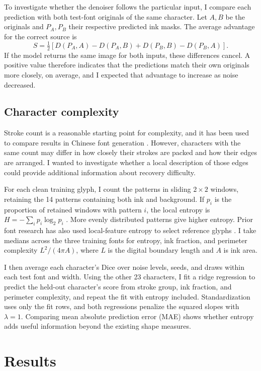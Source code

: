 \documentclass[11pt,letterpaper]{article}
\begin{document}
To investigate whether the denoiser follows the particular input, I compare each prediction with both test-font originals of the same character. Let \(A,B\) be the originals and \(P_A,P_B\) their respective predicted ink masks. The average advantage for the correct source is
\[
S=\tfrac12\left[D(P_A,A)-D(P_A,B)+D(P_B,B)-D(P_B,A)\right].
\]
If the model returns the same image for both inputs, these differences cancel. A positive value therefore indicates that the predictions match their own originals more closely, on average, and I expected that advantage to increase as noise decreased.

\subsection{Character complexity}

Stroke count is a reasonable starting point for complexity, and it has been used to compare results in Chinese font generation \cite{yang2024fontdiffuser}. However, characters with the same count may differ in how closely their strokes are packed and how their edges are arranged. I wanted to investigate whether a local description of those edges could provide additional information about recovery difficulty.

For each clean training glyph, I count the patterns in sliding \(2\times2\) windows, retaining the 14 patterns containing both ink and background. If \(p_i\) is the proportion of retained windows with pattern \(i\), the local entropy is \(H=-\sum_i p_i\log_2p_i\) \cite{shannon1948}. More evenly distributed patterns give higher entropy. Prior font research has also used local-feature entropy to select reference glyphs \cite{matsuo2026active}. I take medians across the three training fonts for entropy, ink fraction, and perimeter complexity \(L^2/(4\pi A)\), where \(L\) is the digital boundary length and \(A\) is ink area.

I then average each character's Dice over noise levels, seeds, and draws within each test font and width. Using the other 23 characters, I fit a ridge regression to predict the held-out character's score from stroke group, ink fraction, and perimeter complexity, and repeat the fit with entropy included. Standardization uses only the fit rows, and both regressions penalize the squared slopes with \(\lambda=1\). Comparing mean absolute prediction error (MAE) shows whether entropy adds useful information beyond the existing shape measures.

\section{Results}
\end{document}
